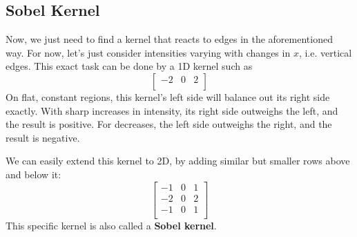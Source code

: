 \documentclass{article}
\begin{document}
\subsection{Sobel Kernel}
Now, we just need to find a kernel that reacts to edges in the aforementioned way. For now, let's just consider intensities varying with changes in $x$, i.e. vertical edges. This exact task can be done by a 1D kernel such as
\[\begin{bmatrix}
    -2 & 0 & 2 \\
\end{bmatrix}\]
On flat, constant regions, this kernel's left side will balance out its right side exactly. With sharp increases in intensity, its right side outweighs the left, and the result is positive. For decreases, the left side outweighs the right, and the result is negative.

We can easily extend this kernel to 2D, by adding similar but smaller rows above and below it:
\[\begin{bmatrix}
    -1 & 0 & 1 \\
    -2 & 0 & 2 \\
    -1 & 0 & 1 \\
\end{bmatrix}\]
This specific kernel is also called a \textbf{Sobel kernel}.
\end{document}
